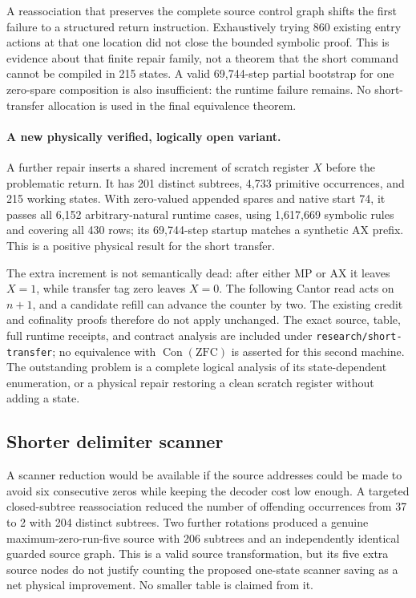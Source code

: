 \documentclass[11pt]{article}
\newcommand{\ZFC}{\mathrm{ZFC}}
\newcommand{\Con}{\operatorname{Con}}
\begin{document}
A reassociation that preserves the complete source control graph shifts the first failure to a structured return instruction. Exhaustively trying 860 existing entry actions at that one location did not close the bounded symbolic proof. This is evidence about that finite repair family, not a theorem that the short command cannot be compiled in 215 states. A valid 69,744-step partial bootstrap for one zero-spare composition is also insufficient: the runtime failure remains. No short-transfer allocation is used in the final equivalence theorem.

\paragraph{A new physically verified, logically open variant.}
A further repair inserts a shared increment of scratch register $X$ before the problematic return. It has 201 distinct subtrees, 4,733 primitive occurrences, and 215 working states. With zero-valued appended spares and native start 74, it passes all 6,152 arbitrary-natural runtime cases, using 1,617,669 symbolic rules and covering all 430 rows; its 69,744-step startup matches a synthetic AX prefix. This is a positive physical result for the short transfer.

The extra increment is not semantically dead: after either MP or AX it leaves $X=1$, while transfer tag zero leaves $X=0$. The following Cantor read acts on $n+1$, and a candidate refill can advance the counter by two. The existing credit and cofinality proofs therefore do not apply unchanged. The exact source, table, full runtime receipts, and contract analysis are included under \texttt{research/short-transfer}; no equivalence with $\Con(\ZFC)$ is asserted for this second machine. The outstanding problem is a complete logical analysis of its state-dependent enumeration, or a physical repair restoring a clean scratch register without adding a state.


\subsection{Shorter delimiter scanner}

A scanner reduction would be available if the source addresses could be made to avoid six consecutive zeros while keeping the decoder cost low enough. A targeted closed-subtree reassociation reduced the number of offending occurrences from 37 to 2 with 204 distinct subtrees. Two further rotations produced a genuine maximum-zero-run-five source with 206 subtrees and an independently identical guarded source graph. This is a valid source transformation, but its five extra source nodes do not justify counting the proposed one-state scanner saving as a net physical improvement. No smaller table is claimed from it.
\end{document}
